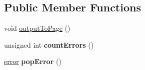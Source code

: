 \subsection*{Public Member Functions}
\begin{DoxyCompactItemize}
\item 
void \hyperlink{classnightowl_1_1Builder_a5ce57746bc8b306051408e36672bbc5e}{output\-To\-Page} ()
\item 
\hypertarget{classnightowl_1_1Builder_a17dc29bcab6ec44e794c5fbea3ddf461}{unsigned int {\bfseries count\-Errors} ()}\label{classnightowl_1_1Builder_a17dc29bcab6ec44e794c5fbea3ddf461}

\item 
\hypertarget{classnightowl_1_1Builder_a5e9037bce75a09ca561a7599833e6dd9}{\hyperlink{structnightowl_1_1Builder_1_1error}{error} {\bfseries pop\-Error} ()}\label{classnightowl_1_1Builder_a5e9037bce75a09ca561a7599833e6dd9}


\end{DoxyCompactItemize}
